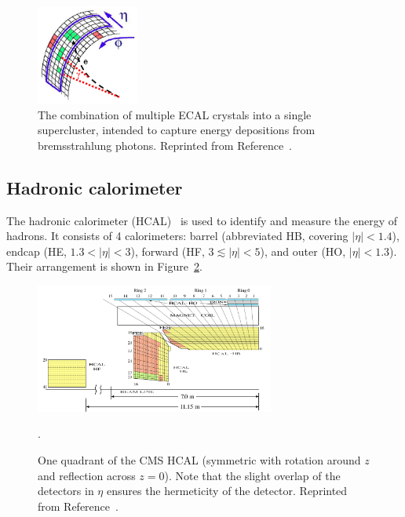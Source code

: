\begin{figure}[]
    \begin{center} 
        \includegraphics[width=0.3\textwidth]{figures/cms/sc.png}
        \caption{The combination of multiple ECAL crystals into a single supercluster, intended to capture energy depositions from bremsstrahlung photons.
                  Reprinted from Reference~\cite{cmsecalrev}.}
        \label{fig:cms:sc}
    \end{center}
\end{figure}

\subsection{Hadronic calorimeter}

The hadronic calorimeter (HCAL)~\cite{cmshcaltdr,cmspf,cmshcalperf} is used to identify and measure the energy of hadrons.
It consists of 4 calorimeters: barrel (abbreviated HB, covering $|\eta|<1.4$), endcap (HE, $1.3<|\eta|<3$), forward (HF, $3\lesssim|\eta|<5$), and outer (HO, $|\eta|<1.3$).
Their arrangement is shown in Figure~\ref{fig:cms:hcal}.

\begin{figure}[]
\begin{center}
    \includegraphics[width=0.7\textwidth]{figures/cms/hcal.png}
    \caption{One quadrant of the CMS HCAL (symmetric with rotation around $z$ and reflection across $z=0$).
             Note that the slight overlap of the detectors in $\eta$ ensures the hermeticity of the detector.
             Reprinted from Reference~\cite{cmshcalperf}.}
    \label{fig:cms:hcal}.
\end{center}
\end{figure}


